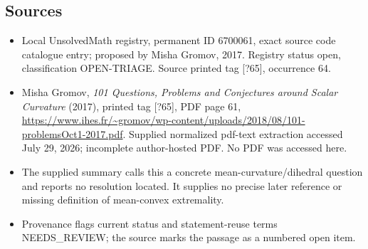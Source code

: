 \documentclass[11pt]{article}
\begin{document}
\subsection{Sources}
\begin{itemize}
\item Local UnsolvedMath registry, permanent ID 6700061, exact source code catalogue entry; proposed by Misha Gromov, 2017. Registry status open, classification OPEN-TRIAGE. Source printed tag [?65], occurrence 64.
\item Misha Gromov, \emph{101 Questions, Problems and Conjectures around Scalar Curvature} (2017), printed tag [?65], PDF page 61, \url{https://www.ihes.fr/~gromov/wp-content/uploads/2018/08/101-problemsOct1-2017.pdf}. Supplied normalized pdf-text extraction accessed July 29, 2026; incomplete author-hosted PDF. No PDF was accessed here.
\item The supplied summary calls this a concrete mean-curvature/dihedral question and reports no resolution located. It supplies no precise later reference or missing definition of mean-convex extremality.
\item Provenance flags current status and statement-reuse terms NEEDS\_REVIEW; the source marks the passage as a numbered open item.
\end{itemize}
\end{document}
